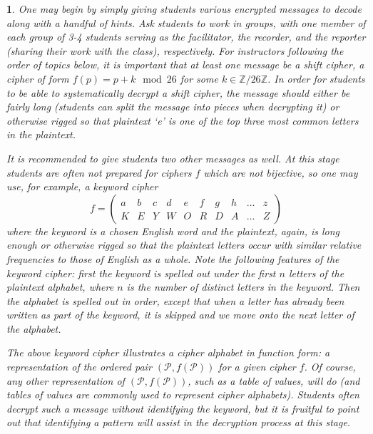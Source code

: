 \documentclass[11pt]{article}
\theoremstyle{plain}
\theoremstyle{remark}
\theoremstyle{definition}
\theoremstyle{definition}
\theoremstyle{definition}
\theoremstyle{plain}
\theoremstyle{plain}
\theoremstyle{plain}
\newtheorem{act}[thm]{\protect\activityname}
\theoremstyle{definition}
\providecommand{\activityname}{Activity}
\begin{document}
\begin{act}
One may begin by simply giving students various encrypted messages
to decode along with a handful of hints. Ask students to work in groups,
with one member of each group of 3-4 students serving as the facilitator,
the recorder, and the reporter (sharing their work with the class),
respectively. For instructors following the order of topics below,
it is important that at least one message be a \textit{shift cipher},
a cipher of form $f(p)=p+k\mod26$ for some $k\in\mathbb{Z}/26\mathbb{Z}$. In order for students to be able to systematically decrypt a shift cipher, the message should either be fairly long (students can split the message into pieces when decrypting it) or otherwise rigged so that plaintext `e' is one of the top three most common letters in the plaintext.

It is recommended to give students two other messages as well. At this stage students
are often not prepared for ciphers $f$ which are not bijective, so
one may use, for example, a \textit{keyword cipher}
\[
f=\begin{pmatrix}a & b & c & d & e & f & g & h & \dots & z \\
				 K & E & Y & W & O & R & D & A & \dots & Z 
\end{pmatrix}
\]
where the \textit{keyword} is a chosen English word and the plaintext, again, is long enough or otherwise rigged so that the plaintext letters occur with similar relative frequencies to those of English as a whole. Note the following
features of the keyword cipher: first the keyword is spelled out under the
first $n$ letters of the plaintext alphabet, where $n$ is the number
of distinct letters in the keyword. Then the alphabet is spelled out
in order, except that when a letter has already been written as part
of the keyword, it is skipped and we move onto the next letter of
the alphabet.

The above keyword cipher illustrates a \textit{cipher alphabet} in
function form: a representation of the ordered pair $(\mathcal{P},f(\mathcal{P}))$
for a given cipher $f$.
Of course, any other representation of $(\mathcal{P},f(\mathcal{P}))$,
such as a table of values, will do (and tables of values are commonly
used to represent cipher alphabets). Students often decrypt such a message
without identifying the keyword, but it is fruitful to point out that
identifying a pattern will assist in the decryption process at this
stage. 


\end{act}
\end{document}
